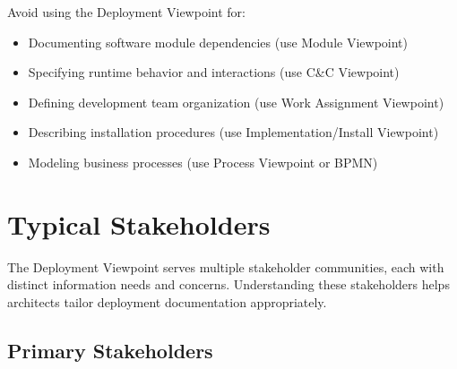 \documentclass[11pt,letterpaper]{article}
\begin{document}
\begin{warningbox}
Avoid using the Deployment Viewpoint for:

\begin{itemize}[nosep]
    \item Documenting software module dependencies (use Module Viewpoint)
    \item Specifying runtime behavior and interactions (use C\&C Viewpoint)
    \item Defining development team organization (use Work Assignment Viewpoint)
    \item Describing installation procedures (use Implementation/Install Viewpoint)
    \item Modeling business processes (use Process Viewpoint or BPMN)
\end{itemize}
\end{warningbox}

\section{Typical Stakeholders}

The Deployment Viewpoint serves multiple stakeholder communities, each with distinct information needs and concerns. Understanding these stakeholders helps architects tailor deployment documentation appropriately.

\subsection{Primary Stakeholders}
\end{document}
